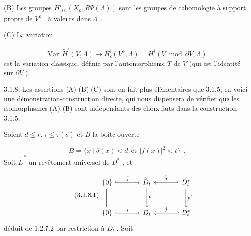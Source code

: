 (B) Les groupes $H^i_{\{0\}}(X_o, R\Psi(\Lambda))$ sont les groupes de cohomologie à support propre de $V^o$ , à valeurs dans $\Lambda$ .

(C) La variation 



\begin{equation*}
 \mathrm{Var} : \widetilde{H}^i(V, \Lambda) \longrightarrow H^i_c(V^o, \Lambda) = H^i(V \bmod \partial V, \Lambda)
\end{equation*}
est la variation classique, définie par l'automorphisme $T$ de $V$ (qui est l'identité sur $\partial V$ ).

3.1.8. Les assertions (A) (B) (C) sont en fait plus élémentaires que 3.1.5; en voici une démonstration-construction directe, qui nous dispensera de vérifier que les isomorphismes (A) (B) sont indépendants des choix faits dans la construction 3.1.5.

Soient $d \leq r$, $t \leq \tau(d)$ et $B$ la boîte ouverte

\begin{equation*}
B = \{x \mid \delta(x) < d \ \ \text{et} \ \ |f(x)|^2 < t\} \ \ .
\end{equation*}
Soit $\widetilde{D}^*$ un revêtement universel de $D^*$ , et

\begin{equation}\tag{3.1.8.1}
\begin{tikzcd}[column sep=large, row sep=large]
\{0\} \arrow[r, hook, "\overline{i}"] \arrow[d, equal] & \widetilde{D}_t \arrow[d, "p"] & \widetilde{D}^*_t \arrow[l, hook', "\overline{j}"'] \arrow[d, "p'"] \\
\{0\} \arrow[r, hook, "i"] & D_t & D^*_t \arrow[l, hook', "j"']
\end{tikzcd}
\end{equation}
déduit de 1.2.7.2 par restriction à $D_t$ . Soit

